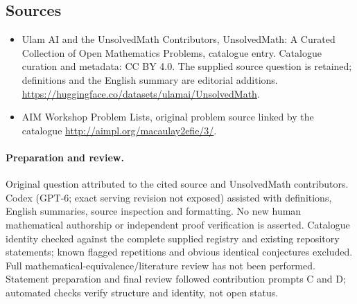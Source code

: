 \documentclass[11pt]{article}
\begin{document}
\subsection{Sources}
\begin{itemize}
\item[\hypertarget{source:statement:1}{S1}] Ulam AI and the UnsolvedMath Contributors, UnsolvedMath: A Curated Collection of Open Mathematics Problems, catalogue entry. Catalogue curation and metadata: CC BY 4.0. The supplied source question is retained; definitions and the English summary are editorial additions.
\url{https://huggingface.co/datasets/ulamai/UnsolvedMath}.
\item[\hypertarget{source:statement:2}{S2}] AIM Workshop Problem Lists, original problem source linked by the catalogue
\url{http://aimpl.org/macaulay2efie/3/}.
\end{itemize}
\paragraph{Preparation and review.}
Original question attributed to the cited source and UnsolvedMath contributors. Codex (GPT-6; exact serving revision not exposed) assisted with definitions, English summaries, source inspection and formatting. No new human mathematical authorship or independent proof verification is asserted. Catalogue identity checked against the complete supplied registry and existing repository statements; known flagged repetitions and obvious identical conjectures excluded. Full mathematical-equivalence/literature review has not been performed. Statement preparation and final review followed contribution prompts C and D; automated checks verify structure and identity, not open status.
\label{end:statement}
\end{document}
